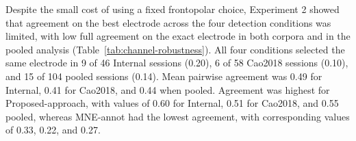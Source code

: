 Despite the small cost of using a fixed frontopolar choice, Experiment 2 showed that agreement on the best electrode across the four detection conditions was limited, with low full agreement on the exact electrode in both corpora and in the pooled analysis (Table~\ref{tab:channel-robustness}). All four conditions selected the same electrode in 9 of 46 Internal sessions (0.20), 6 of 58 Cao2018 sessions (0.10), and 15 of 104 pooled sessions (0.14). Mean pairwise agreement was 0.49 for Internal, 0.41 for Cao2018, and 0.44 when pooled. Agreement was highest for Proposed-approach, with values of 0.60 for Internal, 0.51 for Cao2018, and 0.55 pooled, whereas MNE-annot had the lowest agreement, with corresponding values of 0.33, 0.22, and 0.27.
